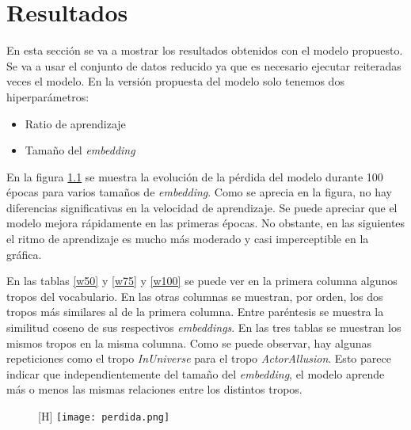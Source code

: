 \chapter{Resultados}

En esta sección se va a mostrar los resultados obtenidos con el modelo propuesto. Se va a usar el conjunto de datos reducido ya que es necesario ejecutar reiteradas veces el modelo. En la versión
propuesta del modelo solo tenemos dos hiperparámetros:
\begin{itemize}
  \item Ratio de aprendizaje
  \item Tamaño del \textit{embedding}
\end{itemize}

En la figura \ref{embedding_size} se muestra la evolución de la pérdida del modelo durante 100 épocas para varios tamaños de \textit{embedding}. Como se aprecia en la figura, no hay diferencias significativas
en la velocidad de aprendizaje. Se puede apreciar que el modelo mejora rápidamente en las primeras épocas. No obstante, en las siguientes el ritmo de aprendizaje es mucho más moderado y casi imperceptible
en la gráfica.

En las tablas \ref{w50} y \ref{w75} y \ref{w100} se puede ver en la primera columna algunos tropos del vocabulario. En las otras columnas se muestran, por orden, los dos tropos más similares
al de la primera columna. Entre paréntesis se muestra la similitud coseno de sus respectivos \textit{embeddings}. En las tres tablas se muestran los mismos tropos en la misma columna. Como se puede observar,
hay algunas repeticiones como el tropo \textit{InUniverse} para el tropo \textit{ActorAllusion}. Esto parece indicar que independientemente del tamaño del \textit{embedding}, el modelo aprende más o menos las mismas
relaciones entre los distintos tropos.

\begin{figure}\label{embedding_size}[H]
  \texttt{[image: perdida.png]}
  \centering
\end{figure}

\begin{center}
  \begin{table}
  \caption{Tropos similares usando \textit{embeddings} de tamaño 50}
  \label{w50}
  \end{table}
\end{center}


